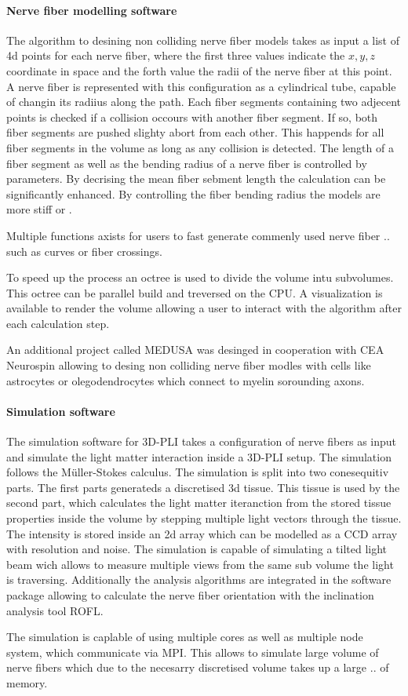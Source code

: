 \paragraph{Nerve fiber modelling software}
% 
The algorithm to desining non colliding nerve fiber models takes as input a list of 4d points for each nerve fiber, where the first three values indicate the $x,y,z$ coordinate in space and the forth value the radii of the nerve fiber at this point.
A nerve fiber is represented with this configuration as a cylindrical tube, capable of changin its radiius along the path.
Each fiber segments containing two adjecent points is checked if a collision occours with another fiber segment.
If so, both fiber segments are pushed slighty abort from each other.
This happends for all fiber segments in the volume as long as any collision is detected.
The length of a fiber segment as well as the bending radius of a nerve fiber is controlled by parameters.
By decrising the mean fiber sebment length the calculation can be significantly enhanced. 
By controlling the fiber bending radius the models are more stiff or \dummy{}.
\par
Multiple functions axists for users to fast generate commenly used nerve fiber  .. such as curves or fiber crossings.
% 
\par
% 
To speed up the process an octree is used to divide the volume intu subvolumes.
This octree can be parallel build and treversed on the \ac{CPU}.
A visualization is available to render the volume allowing a user to interact with the algorithm after each calculation step.
\par
% 
An additional project called \ac{MEDUSA} was desinged in cooperation with \ac{CEA} Neurospin allowing to desing non colliding nerve fiber modles with cells like astrocytes or olegodendrocytes which connect to myelin sorounding axons.
% 
% 
% 
\paragraph{Simulation software}
% 
The simulation software for \ac{3D-PLI} takes a configuration of nerve fibers as input and simulate the light matter interaction inside a \ac{3D-PLI} setup.
The simulation follows the M\"{u}ller-Stokes calculus.
The simulation is split into two conesequitiv parts.
The first parts generateds a discretised 3d tissue.
This tissue is used by the second part, which calculates the light matter iteranction from the stored tissue properties inside the volume by stepping multiple light vectors through the tissue.
The intensity is stored inside an 2d array which can be modelled as a \ac{CCD} array with resolution and noise.
The simulation is capable of simulating a tilted light beam wich allows to measure multiple views from the same sub volume the light is traversing.
Additionally the analysis algorithms are integrated in the software package allowing to calculate the nerve fiber orientation with the inclination analysis tool \ac{ROFL}.
\par
% 
The simulation is caplable of using multiple cores as well as multiple node system, which communicate via \ac{MPI}.
This allows to simulate large volume of nerve fibers which due to the necesarry discretised volume takes up a large .. of memory.
% 
% 
% 
